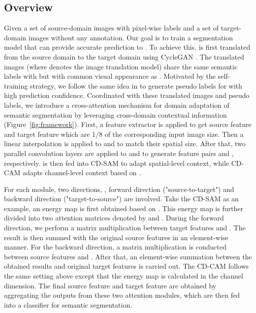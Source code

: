 \documentclass[10pt,twocolumn,letterpaper]{article}
\begin{document}
	\subsection{Overview}

	Given a set of source-domain images  with pixel-wise labels  and a set of target-domain images  without any annotation. Our goal is to train a segmentation model that can provide accurate prediction to . To achieve this,  is first translated from the source domain to the target domain using CycleGAN \cite{zhu2017unpaired}. The translated images  (where  denotes the image translation model) share the same semantic labels with  but with common visual appearance as . Motivated by the self-training strategy, we follow the same idea in \cite{li2019bidirectional} to generate pseudo labels  for  with high prediction confidence. Coordinated with these translated images and pseudo labels, we introduce a cross-attention mechanism for domain adaptation of semantic segmentation by leveraging cross-domain contextual information (Figure~\ref{fig:framework}). First, a feature extractor  is applied to get source feature  and target feature  which are 1/8 of the corresponding input image size. Then a linear interpolation is applied to  and  to match their spatial size. After that, two parallel convolution layers are applied to  and  to generate feature pairs  and , respectively.  is then fed into CD-SAM to adapt spatial-level context, while CD-CAM adapts channel-level context based on .


	For each module, two directions, \ie, forward direction ("source-to-target") and backward direction ("target-to-source") are involved. Take the CD-SAM as an example, an energy map is first obtained based on . This energy map is further divided into two attention matrices denoted by  and . During the forward direction, we perform a matrix multiplication between target features and . The result is then summed with the original source features in an element-wise manner. For the backward direction, a matrix multiplication is conducted between source features and . After that, an element-wise summation between the obtained results and original target features is carried out. The CD-CAM follows the same setting above except that the energy map is calculated in the channel dimension. The final source feature and target feature are obtained by aggregating the outputs from these two attention modules, which are then fed into a classifier  for semantic segmentation.
\end{document}
